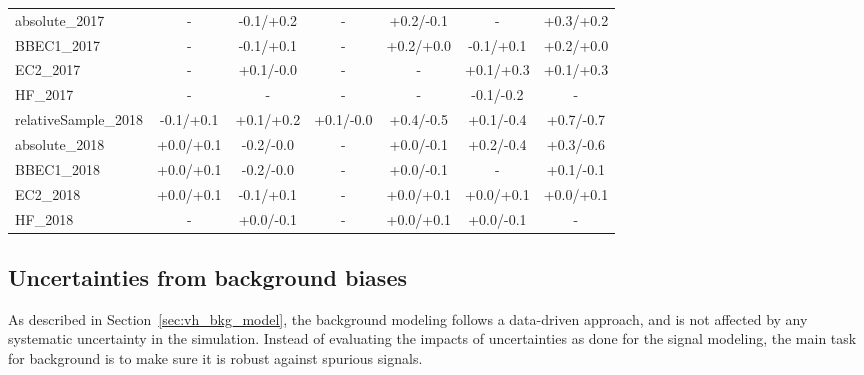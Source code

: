 \begin{table}[!htb]
{\begin{tabular}{l|c|c|c|c|c|c}
  absolute\_2017       & -           & -0.1/+0.2   & -           & +0.2/-0.1   & -           & +0.3/+0.2   \\   
  BBEC1\_2017          & -           & -0.1/+0.1   & -           & +0.2/+0.0   & -0.1/+0.1   & +0.2/+0.0   \\   
  EC2\_2017            & -           & +0.1/-0.0   & -           & -           & +0.1/+0.3   & +0.1/+0.3   \\   
  HF\_2017             & -           & -           & -           & -           & -0.1/-0.2   & -           \\   
  \hline
  relativeSample\_2018 & -0.1/+0.1   & +0.1/+0.2   & +0.1/-0.0   & +0.4/-0.5   & +0.1/-0.4   & +0.7/-0.7   \\
  absolute\_2018       & +0.0/+0.1   & -0.2/-0.0   & -           & +0.0/-0.1   & +0.2/-0.4   & +0.3/-0.6   \\   
  BBEC1\_2018          & +0.0/+0.1   & -0.2/-0.0   & -           & +0.0/-0.1   & -           & +0.1/-0.1   \\   
  EC2\_2018            & +0.0/+0.1   & -0.1/+0.1   & -           & +0.0/+0.1   & +0.0/+0.1   & +0.0/+0.1   \\   
  HF\_2018             & -           & +0.0/-0.1   & -           & +0.0/+0.1   & +0.0/-0.1   & -           \\   
  \hline

  \end{tabular}}
  \label{tab:vh_systematics_jec}
\end{table}


\clearpage
\subsection{Uncertainties from background biases}\label{sec:bias_study}

As described in Section~\ref{sec:vh_bkg_model}, the background modeling follows a data-driven approach,
and is not affected by any systematic uncertainty in the simulation.
Instead of evaluating the impacts of uncertainties as done for the signal modeling, 
the main task for background is to make sure it is robust against spurious signals.

